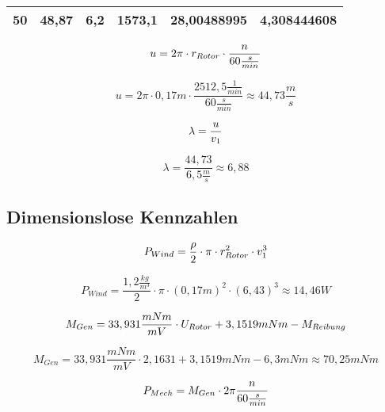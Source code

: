 \begin{table}[ht!]
\begin{tabular}{|l|l|l|l|l|l|}
    \rowcolor[HTML]{E2EFDA} 
    50                                    & 48,87                                  & 6,2                                                & 1573,1                                   & 28,00488995                                          & 4,308444608                                    \\ \hline
    \end{tabular}
    \end{table}

\begin{equation}
    \centering
    u = 2 \pi \cdot r_{Rotor} \cdot \frac{n}{60 \frac{s}{min}}
    \label{eq:230615_Umfangsgeschwindigkeit}
\end{equation}

$$    u = 2 \pi \cdot 0,17m \cdot \frac{2512,5 \frac{1}{min}}{60 \frac{s}{min}}\approx 44,73\frac{m}{s} $$

\begin{equation}
    \centering
    \lambda = \frac{u}{v_1}
    \label{eq:230615_Schnelllaufzahl}
\end{equation}

$$\lambda = \frac{44,73}{6,5 \frac{m}{s}}\approx 6,88$$


\subsection{Dimensionslose Kennzahlen}

\begin{equation}
    \centering
    P_{Wind} = \frac{\rho}{2} \cdot \pi \cdot r_{Rotor}^2 \cdot v_1^3
    \label{eq:230615_Leistung_Wind}
\end{equation}

$$P_{Wind} = \frac{1,2 \frac{kg}{m^3}}{2} \cdot \pi \cdot (0,17 m)^2 \cdot (6,43)^3 \approx 14,46 W$$

\begin{equation}
    \centering
    M_{Gen} = 33,931\frac{mNm}{mV} \cdot U_{Rotor} + 3,1519 mNm - M_{Reibung}
    \label{eq:230615_Genratormoment}
\end{equation}

$$M_{Gen} = 33,931\frac{mNm}{mV} \cdot 2,1631 + 3,1519 mNm - 6,3mNm \approx 70,25 mNm$$

\begin{equation}
    \centering
    P_{Mech} = M_{Gen} \cdot 2 \pi \frac{n}{60\frac{s}{min}}
    \label{eq:230615_Mechanischeleistung}
\end{equation}


